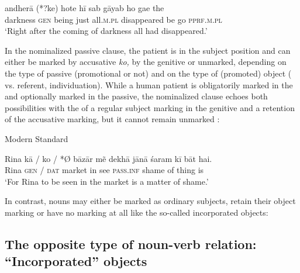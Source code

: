 \documentclass[output=paper]{LSP/langsci}
\begin{document}
\ex \label{10-mo-ex:22c}
\gll andherā (*?ke) hote hī sab gāyab ho gae the\\
 darkness \textsc{gen} being just all.\textsc{m.pl} disappeared be go \textsc{pprf.m.pl}\\
\glt ‘Right after the coming of darkness all had disappeared.’
\z
\z

In the nominalized passive clause, the patient is in the subject position and can either be marked by accusative \textit{ko}\textit{,} by the genitive or unmarked, depending on the type of passive (promotional or not) and on the type of (promoted) object ( vs.  referent, individuation). While a human patient is obligatorily marked in the  and optionally marked in the passive, the nominalized clause echoes both possibilities with the  of a regular subject marking in the genitive and a retention of the accusative marking, but it cannot remain unmarked : 

\ea Modern Standard  \citep[9]{Bhatt2007Unaccusativity}

\label{10-mo-ex:23}
\gll  Rina kā / ko / *Ø bāzār mẽ dekhā jānā śaram kī bāt hai.\\
 Rina \textsc{gen} / \textsc{dat} { } { } market in see \textsc{pass.inf} shame of thing is\\
\glt ‘For Rina to be seen in the market is a matter of shame.’ 
\z

In contrast,  nouns may either be marked as ordinary subjects, retain their object marking or have no marking at all like the so-called incorporated objects:


\subsection{The opposite type of noun-verb relation: “Incorporated” objects} \label{10-mo-sec:3.3}
\end{document}
